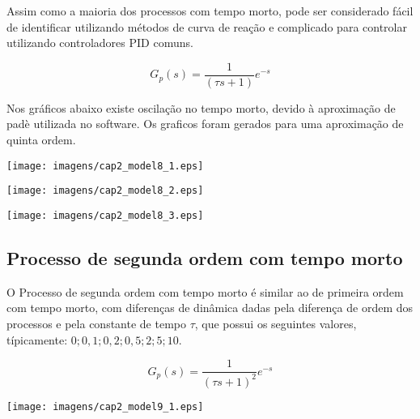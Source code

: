     Assim como a maioria dos processos com tempo morto, pode ser considerado
    fácil de identificar utilizando métodos de curva de reação e complicado para
    controlar utilizando controladores \acs{PID} comuns.

    \begin{equation}
        G_p(s) = \frac{1}{(\tau s +1)}e^{-s}
    \end{equation}
    
    Nos gráficos abaixo existe oscilação no tempo morto, devido à aproximação de
    padè utilizada no software. Os graficos foram gerados para uma aproximação
    de quinta ordem.

    \begin{center}
        \texttt{[image: imagens/cap2\_model8\_1.eps]}
    \end{center}

    \begin{center}
        \texttt{[image: imagens/cap2\_model8\_2.eps]}
    \end{center}
    
    \begin{center}
        \texttt{[image: imagens/cap2\_model8\_3.eps]}
    \end{center}

\subsection{Processo de segunda ordem com tempo morto}
    
    O Processo de segunda ordem com tempo morto é similar ao de primeira ordem
    com tempo morto, com diferenças de dinâmica dadas pela diferença de ordem
    dos processos e pela constante de tempo $\tau$, que possui os seguintes valores,
    típicamente: $0; 0,1; 0,2; 0,5; 2; 5; 10$.
    
    \begin{equation}
        G_p(s) = \frac{1}{(\tau s +1)^2}e^{-s}
    \end{equation}

    \begin{center}
        \texttt{[image: imagens/cap2\_model9\_1.eps]}
    \end{center}
    
